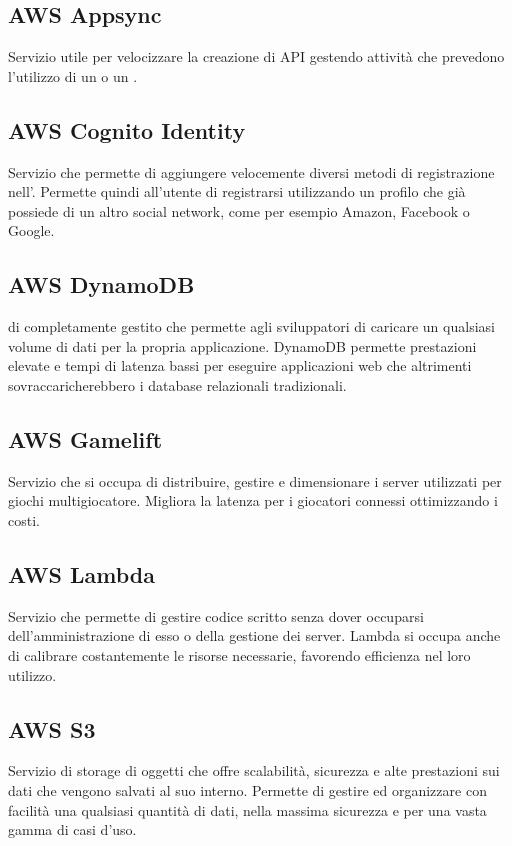 \subsection*{AWS Appsync}
Servizio  utile per velocizzare la creazione di API gestendo attività che prevedono l'utilizzo di un  o un .

\subsection*{AWS Cognito Identity}
Servizio  che permette di aggiungere velocemente diversi metodi di registrazione nell'. Permette quindi all'utente di registrarsi utilizzando un profilo che già possiede di un altro social network, come per esempio Amazon, Facebook o Google. 

\subsection*{AWS DynamoDB}
  di  completamente gestito che permette agli sviluppatori di caricare un qualsiasi volume di dati per la propria applicazione. DynamoDB permette prestazioni elevate e tempi di latenza bassi per eseguire applicazioni web che altrimenti sovraccaricherebbero i database relazionali tradizionali.

\subsection*{AWS Gamelift}
Servizio  che si occupa di distribuire, gestire e dimensionare i server  utilizzati per giochi multigiocatore. Migliora la latenza per i giocatori connessi ottimizzando i costi.

\subsection*{AWS Lambda}
Servizio  che permette di gestire codice scritto senza dover occuparsi dell'amministrazione di esso o della gestione dei server. Lambda si occupa anche di calibrare costantemente le risorse necessarie, favorendo efficienza nel loro utilizzo. 

\subsection*{AWS S3}
Servizio  di storage di oggetti che offre scalabilità, sicurezza e alte prestazioni sui dati che vengono salvati al suo interno. Permette di gestire ed organizzare con facilità una qualsiasi quantità di dati, nella massima sicurezza e per una vasta gamma di casi d'uso.

